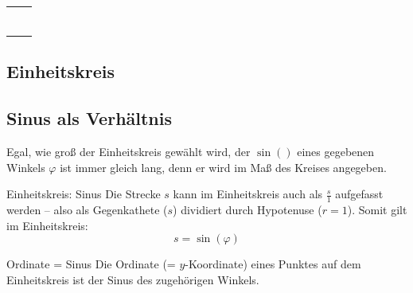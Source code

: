 \begin{tabular}{cc}\makecell{
  $P=(-4 | -4) \TRAINER{=225\degre=-135\degre}$\\
  \miniEinheitskreis{}} &

  \makecell{$P=\left( \frac{\sqrt{3}}2 \bigg| 1\right)\TRAINER{=30\degre}$\\
  \miniEinheitskreis{}} \\

  \makecell{$P=\left( \frac{\sqrt{-3}}2 \bigg| 1\right)\TRAINER{=150\degre}$\\
  \miniEinheitskreis{}} &

  \makecell{$P=(-1 | 0)\TRAINER{=180\degre = -180\degre}$\\
  \miniEinheitskreis{}} \\

\end{tabular}


\newpage
\subsection{Einheitskreis}





\subsection{Sinus als Verhältnis}
Egal, wie groß der Einheitskreis gewählt wird, der $\sin()$ eines
gegebenen Winkels $\varphi$ ist immer gleich lang, denn er wird im Maß
des Kreises angegeben.


\begin{gesetz}{Einheitskreis: Sinus}{}
  Die Strecke $s$ kann im Einheitskreis auch als $\frac{s}1$ aufgefasst werden -- also
  als Gegenkathete ($s$) dividiert durch Hypotenuse ($r=1$). Somit
  gilt im Einheitskreis:
  $$s = \sin(\varphi)$$
\end{gesetz}

\begin{gesetz}{Ordinate = Sinus}{}
  Die Ordinate (= $y$-Koordinate) eines Punktes auf dem Einheitskreis ist
  der Sinus des zugehörigen Winkels.
\end{gesetz}

